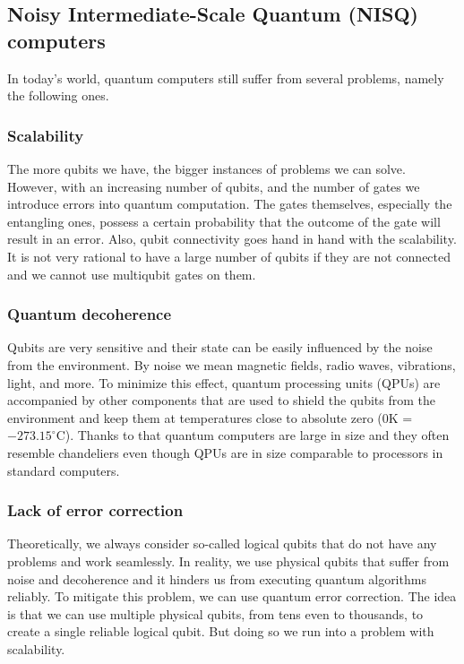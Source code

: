\subsection{Noisy Intermediate-Scale Quantum (NISQ) computers}
In today's world, quantum computers still suffer from several problems, namely the following ones.

\subsubsection{Scalability}
The more qubits we have, the bigger instances of problems we can solve. However, with an increasing number of qubits, and the number of gates we introduce errors into quantum computation. The gates themselves, especially the entangling ones, possess a certain probability that the outcome of the gate will result in an error. Also, qubit connectivity goes hand in hand with the scalability. It is not very rational to have a large number of qubits if they are not connected and we cannot use multiqubit gates on them.

\subsubsection{Quantum decoherence}
Qubits are very sensitive and their state can be easily influenced by the noise from the environment. By noise we mean magnetic fields, radio waves, vibrations, light, and more. To minimize this effect, quantum processing units (QPUs) are accompanied by other components that are used to shield the qubits from the environment and keep them at temperatures close to absolute zero ($0$K = $-273.15^{\circ}$C). Thanks to that quantum computers are large in size and they often resemble chandeliers even though QPUs are in size comparable to processors in standard computers.

\subsubsection{Lack of error correction}
Theoretically, we always consider so-called logical qubits that do not have any problems and work seamlessly. In reality, we use physical qubits that suffer from noise and decoherence and it hinders us from executing quantum algorithms reliably. To mitigate this problem, we can use quantum error correction. The idea is that we can use multiple physical qubits, from tens even to thousands, to create a single reliable logical qubit. But doing so we run into a problem with scalability. 

